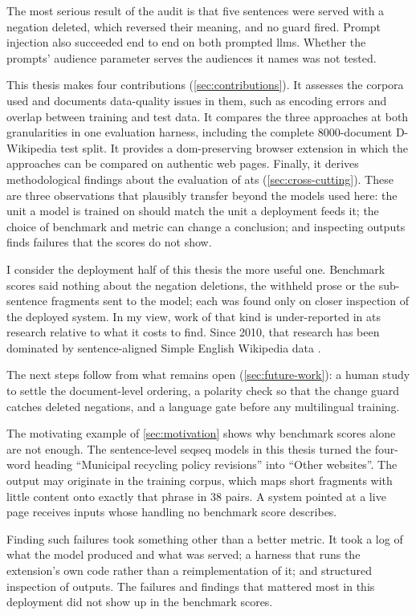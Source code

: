 The most serious result of the audit is that five sentences were served with a negation deleted, which reversed their meaning, and no guard fired.
Prompt injection also succeeded end to end on both prompted \glspl{llm}.
Whether the prompts' audience parameter serves the audiences it names was not tested.

This thesis makes four contributions (\cref{sec:contributions}).
It assesses the corpora used and documents data-quality issues in them, such as encoding errors and overlap between training and test data.
It compares the three approaches at both granularities in one evaluation harness, including the complete \num{8000}-document D-Wikipedia test split.
It provides a \gls{dom}-preserving browser extension in which the approaches can be compared on authentic web pages.
Finally, it derives methodological findings about the evaluation of \gls{ats} (\cref{sec:cross-cutting}).
These are three observations that plausibly transfer beyond the models used here: the unit a model is trained on should match the unit a deployment feeds it; the choice of benchmark and metric can change a conclusion; and inspecting outputs finds failures that the scores do not show.

I consider the deployment half of this thesis the more useful one.
Benchmark scores said nothing about the negation deletions, the withheld prose or the sub-sentence fragments sent to the model; each was found only on closer inspection of the deployed system.
In my view, work of that kind is under-reported in \gls{ats} research relative to what it costs to find.
Since 2010, that research has been dominated by sentence-aligned Simple English Wikipedia data \parencite[402]{xu-etal-2016-optimizing}.

The next steps follow from what remains open (\cref{sec:future-work}): a human study to settle the document-level ordering, a polarity check so that the change guard catches deleted negations, and a language gate before any multilingual training.

The motivating example of \cref{sec:motivation} shows why benchmark scores alone are not enough.
The sentence-level \gls{seqseq} models in this thesis turned the four-word heading ``Municipal recycling policy revisions'' into ``Other websites''.
The output may originate in the training corpus, which maps short fragments with little content onto exactly that phrase in 38 pairs.
A system pointed at a live page receives inputs whose handling no benchmark score describes.

Finding such failures took something other than a better metric.
It took a log of what the model produced and what was served; a harness that runs the extension's own code rather than a reimplementation of it; and structured inspection of outputs.
The failures and findings that mattered most in this deployment did not show up in the benchmark scores.
